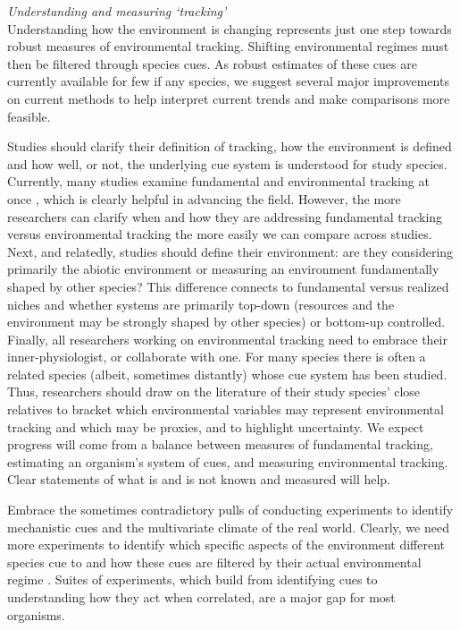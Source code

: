 \documentclass[11pt,letterpaper]{article}
\begin{document}
\emph{Understanding and measuring `tracking'} \\
Understanding how the environment is changing represents just one step towards robust measures of environmental tracking. Shifting environmental regimes must then be filtered through species cues. As robust estimates of these cues are currently available for few if any species, we suggest several major improvements on current methods to help interpret current trends and make comparisons more feasible. 

Studies should clarify their definition of tracking, how the environment is defined and how well, or not, the underlying cue system is understood for study species. Currently, many studies examine fundamental and environmental tracking at once \citep[e.g.,][]{yang2020}, which is clearly helpful in advancing the field. However, the more researchers can clarify when and how they are addressing fundamental tracking versus environmental tracking the more easily we can compare across studies. Next, and relatedly, studies should define their environment: are they considering primarily the abiotic environment or measuring an environment fundamentally shaped by other species? This difference connects to fundamental versus realized niches and  whether systems are primarily top-down (resources and the environment may be strongly shaped by other species) or bottom-up controlled. Finally, all researchers working on environmental tracking need to embrace their inner-physiologist, or collaborate with one. For many species there is often a related species (albeit, sometimes distantly) whose cue system has been studied. Thus, researchers should draw on the literature of their study species' close relatives to bracket which environmental variables may represent environmental tracking and which may be proxies, and to highlight uncertainty. We expect progress will come from a balance between measures of fundamental tracking, estimating an organism's system of cues, and measuring environmental tracking. Clear statements of what is and is not known and measured will help. 

Embrace the sometimes contradictory pulls of conducting experiments to identify mechanistic cues and the multivariate climate of the real world. Clearly, we need more experiments to identify which specific aspects of the environment different species cue to and how these cues are filtered by their actual environmental regime \citep[as outlined above and see][]{chmura2019}. Suites of experiments, which build from identifying cues to understanding how they act when correlated, are a major gap for most organisms. 
\end{document}
